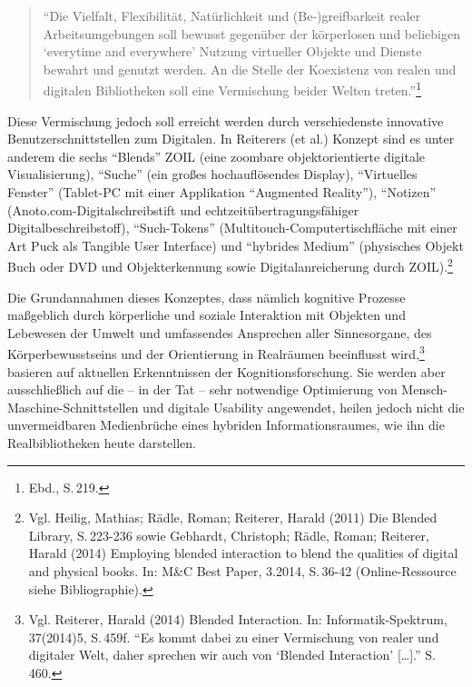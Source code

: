 \documentclass[a4paper,
fontsize=11pt,
oneside,
numbers=noperiodatend,
parskip=half-,
bibliography=totoc,
final
]{scrartcl}
\begin{document}
\begin{quote}
\enquote{Die Vielfalt, Flexibilität, Natürlichkeit und (Be-)greifbarkeit
realer Arbeitsumgebungen soll bewusst gegenüber der körperlosen und
beliebigen \enquote{everytime and everywhere} Nutzung virtueller Objekte
und Dienste bewahrt und genutzt werden. An die Stelle der Koexistenz von
realen und digitalen Bibliotheken soll eine Vermischung beider Welten
treten.}\footnote{Ebd., S.\,219.}
\end{quote}

Diese Vermischung jedoch soll erreicht werden durch verschiedenste
innovative Benutzerschnittstellen zum Digitalen. In Reiterers (et al.)
Konzept sind es unter anderem die sechs \enquote{Blends} ZOIL (eine
zoombare objektorientierte digitale Visualisierung), \enquote{Suche}
(ein großes hochauflösendes Display), \enquote{Virtuelles Fenster}
(Tablet-PC mit einer Applikation \enquote{Augmented Reality}),
\enquote{Notizen} (Anoto.com-Digitalschreibstift und
echtzeitübertragungsfähiger Di\-gi\-tal\-be\-schreib\-stoff),
\enquote{Such-Tokens} (Multitouch-Computertischfläche mit einer Art Puck
als Tangible User Interface) und \enquote{hybrides Medium} (physisches
Objekt Buch oder DVD und Objekterkennung sowie Digitalanreicherung durch
ZOIL).\footnote{Vgl. Heilig, Mathias; Rädle, Roman; Reiterer, Harald
  (2011) Die Blended Library, S.\,223-236 sowie Gebhardt, Christoph;
  Rädle, Roman; Reiterer, Harald (2014) Employing blended interaction to
  blend the qualities of digital and physical books. In: M\&C Best
  Paper, 3.2014, S.\,36-42 (Online-Ressource siehe Bibliographie).}

Die Grundannahmen dieses Konzeptes, dass nämlich kognitive Prozesse
maßgeblich durch körperliche und soziale Interaktion mit Objekten und
Lebewesen der Umwelt und umfassendes Ansprechen aller Sinnesorgane, des
Körperbewusstseins und der Orientierung in Realräumen beeinflusst
wird,\footnote{Vgl. Reiterer, Harald (2014) Blended Interaction. In:
  Informatik-Spektrum, 37(2014)5, S.\,459f. \enquote{Es kommt dabei zu
  einer Vermischung von realer und digitaler Welt, daher sprechen wir
  auch von \enquote{Blended Interaction} {[}\ldots{}{]}.} S.\,460.}
basieren auf aktuellen Erkenntnissen der Kognitionsforschung. Sie werden
aber ausschließlich auf die -- in der Tat -- sehr notwendige Optimierung
von Mensch-Maschine-Schnitt\-stellen und digitale Usability angewendet,
heilen jedoch nicht die unvermeidbaren Medienbrüche eines hybriden
Informationsraumes, wie ihn die Realbibliotheken heute darstellen.
\end{document}
